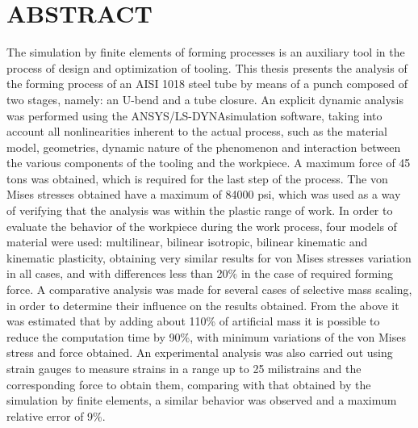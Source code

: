 \chapter*{ABSTRACT}

The simulation by finite elements of forming processes is an auxiliary tool in the process of design and optimization of tooling. This thesis presents the analysis of the forming process of an AISI 1018 steel tube by means of a punch composed of two stages, namely: an U-bend and a tube closure. An explicit dynamic analysis was performed using the ANSYS/LS-DYNA\CR simulation software, taking into account all nonlinearities inherent to the actual process, such as the material model, geometries, dynamic nature of the phenomenon and interaction between the various components of the tooling and the workpiece. A maximum force of 45 tons was obtained, which is required for the last step of the process. The von Mises stresses obtained have a maximum of 84000 psi, which was used as a way of verifying that the analysis was within the plastic range of work. In order to evaluate the behavior of the workpiece during the work process, four models of material were used: multilinear, bilinear isotropic, bilinear kinematic and kinematic plasticity, obtaining very similar results for von Mises stresses variation in all cases, and with differences less than 20\% in the case of required forming force. A comparative analysis was made for several cases of selective mass scaling, in order to determine their influence on the results obtained. From the above it was estimated that by adding about 110\% of artificial mass it is possible to reduce the computation time by 90\%, with minimum variations of the von Mises stress and force obtained. An experimental analysis was also carried out using strain gauges to measure strains in a range up to 25 milistrains and the corresponding force to obtain them, comparing with that obtained by the simulation by finite elements, a similar behavior was observed and a maximum relative error of 9\%.